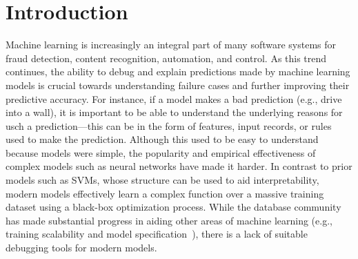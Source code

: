 \section{Introduction}\label{intro}
Machine learning is increasingly an integral part of many software systems for fraud detection, content recognition, automation, and control.
As this trend continues, the ability to debug and explain predictions made by machine learning models is crucial towards understanding failure cases and further improving their predictive accuracy.
For instance, if a model makes a bad prediction (e.g., drive into a wall), it is important to be able to understand the underlying reasons for usch a prediction---this can be in the form of features, input records, or rules used to make the prediction.
Although this used to be easy to understand because models were simple, the popularity and empirical effectiveness of complex models such as neural networks have made it harder.
In contrast to prior models such as SVMs, whose structure can be used to aid interpretability, modern models effectively learn a complex function over a massive training dataset using a black-box optimization process.
While the database community has made substantial progress in aiding other areas of machine learning (e.g., training scalability and model specification~\cite{hellerstein2012madlib,tensor, kraska2013mlbase, crotty2014tupleware, keystone}), there is a lack of suitable debugging tools for modern models.




